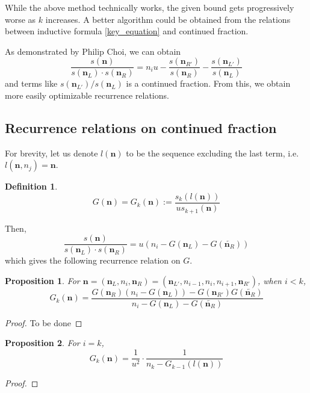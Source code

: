 \documentclass{article}
\theoremstyle{definition}
\newtheorem*{definition}{Definition}
\theoremstyle{plain}
\newtheorem{proposition}{Proposition}[section]
\theoremstyle{remark}
\numberwithin{equation}{section}
\begin{document}
While the above method technically works,
the given bound gets progressively worse as $k$ increases.
A better algorithm could be obtained from the relations between
inductive formula \eqref{key_equation} and continued fraction.

As demonstrated by Philip Choi, we can obtain
\[
  \frac{s(\mathbf{n})}{s(\mathbf{n}_L) \cdot s(\mathbf{n}_R)}
  = n_i u - \frac{s(\mathbf{n}_{R'})}{s(\mathbf{n}_R)} - \frac{s(\mathbf{n}_{L'})}{s(\mathbf{n}_L)}
\]
and terms like $s(\mathbf{n}_{L'}) / s(\mathbf{n}_L)$ is a continued fraction.
From this, we obtain more easily optimizable recurrence relations.

\subsection{Recurrence relations on continued fraction}

For brevity, let us denote $l(\mathbf{n})$ to be the sequence excluding the last term,
i.e. $l(\mathbf{n}, n_j) = \mathbf{n}$.

\begin{definition}
  \[ G(\mathbf{n}) = G_k(\mathbf{n}) := \frac{s_k(l(\mathbf{n}))}{u s_{k+1}(\mathbf{n})} \]
\end{definition}

Then,
\[
  \frac{s(\mathbf{n})}{s(\mathbf{n}_L) \cdot s(\mathbf{n}_R)}
  = u (n_i - G(\mathbf{n}_L) - G(\overleftarrow{\mathbf{n}_R}))
\]
which gives the following recurrence relation on $G$.

\begin{proposition}
  For $\mathbf{n} = (\mathbf{n}_L, n_i, \mathbf{n}_R)
  = (\mathbf{n}_{L'}, n_{i-1}, n_i, n_{i+1}, \mathbf{n}_{R'})$, when $i < k$,
  \[
    G_k(\mathbf{n}) = \frac{
      G(\mathbf{n}_R) (n_i - G(\mathbf{n}_L)) - G(\mathbf{n}_{R'}) G(\overleftarrow{\mathbf{n}_R})
    }{ n_i - G(\mathbf{n}_L) - G(\overleftarrow{\mathbf{n}_R}) }
  \]
\end{proposition}
\begin{proof}
  To be done
\end{proof}

\begin{proposition}
  For $i = k$,
  \[
    G_k(\mathbf{n}) = \frac{1}{u^2} \cdot \frac{1}{n_k - G_{k-1}(l(\mathbf{n}))}
  \]
\end{proposition}
\begin{proof}
  
\end{proof}
\end{document}
